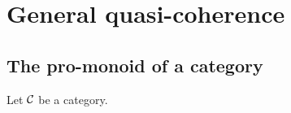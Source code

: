 \chapter{General quasi-coherence}

\section{The pro-monoid of a category}

Let $\mathcal{C}$ be a category. 